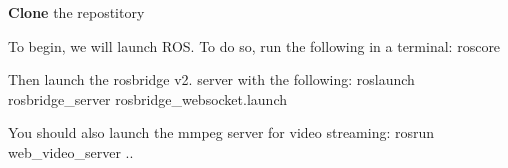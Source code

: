 {\bfseries Clone} the repostitory

To begin, we will launch R\+OS. To do so, run the following in a terminal\+: {\ttfamily roscore}

Then launch the rosbridge v2. server with the following\+: {\ttfamily roslaunch rosbridge\+\_\+server rosbridge\+\_\+websocket.\+launch}

You should also launch the mmpeg server for video streaming\+: {\ttfamily rosrun web\+\_\+video\+\_\+server ..} 
